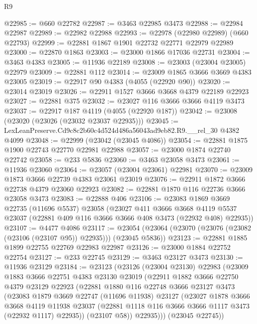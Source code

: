\begin{lexlean}{R9}
\begin{coremodule}
@22985 := @660 @22782
@22987 := @3463 @22985 @3473
@22988 := @22984 @22987
@22989 := @22982 @22988
@22993 := @22978 (@22980 @22989) (@660 @22793)
@22999 := @22881 @1867 @1901 @22732 @22771 @22979 @22989
@23000 := @22870 @1863
@23003 := @23000 @1866 @17036 @22731
@23004 := @3463 @4383
@23005 := @11936 @22189
@23008 := @23003 (@23004 @23005) @22979
@23009 := @22881 @112
@23014 := @23009 @1865 @3666 @3669 @4383 @23005
@23019 := @22917 @90 @4383 (@4055 (@22920 @90))
@23020 := @23014 @23019
@23026 := @22911 @1527 @3666 @3668 @4379 @22189 @22923
@23027 := @22881 @375
@23032 := @23027 @116 @3666 @3666 @4119 @3473
@23037 := @22917 @187 @4119 (@4055 (@22920 @187))
@23042 := @23008 (@23020 (@23026 (@23032 @23037 @22935)))
@23045 := LexLeanPreserve.Cd9c8c2b60c4d524d486a56043ad9eb82.R9.__rel_30 @4382 @4099
@23048 := @22999 (@23042 (@23045 @4086))
@23054 := @22881 @1875 @1900 @22743 @22770 @22981 @22988
@23057 := @23000 @1874 @22740 @22742
@23058 := @233 @5836
@23060 := @3463 @23058 @3473
@23061 := @11936 @23060
@23064 := @23057 (@23004 @23061) @22981
@23070 := @23009 @1873 @3666 @22739 @4383 @23061 @23019
@23076 := @22911 @1872 @3666 @22738 @4379 @23060 @22923
@23082 := @22881 @1870 @116 @22736 @3666 @23058 @3473
@23083 := @22888 @406
@23106 := @23083
    @1869
    @3669
    @22735
    (@11696 @5537)
    @23058
    (@23027
      @411
      @3666
      @3668
      @4119
      @5537
      @23037
      (@22881 @409 @116 @3666 @3666 @408 @3473 (@22932 @408) @22935))
@23107 := @4477 @4086
@23117 := @23054 (@23064 (@23070 (@23076 (@23082 (@23106 (@23107 @95)) @22935))) (@23045 @5836))
@23123 := @22881 @1885 @1899 @22755 @22769 @22983 @22987
@23126 := @23000 @1884 @22752 @22754
@23127 := @233 @22745
@23129 := @3463 @23127 @3473
@23130 := @11936 @23129
@23184 := @23123
    (@23126
      (@23004 @23130)
      @22983
      (@23009
        @1883
        @3666
        @22751
        @4383
        @23130
        @23019
        (@22911
          @1882
          @3666
          @22750
          @4379
          @23129
          @22923
          (@22881
            @1880
            @116
            @22748
            @3666
            @23127
            @3473
            (@23083
              @1879
              @3669
              @22747
              (@11696 @11938)
              @23127
              (@23027
                @1878
                @3666
                @3668
                @4119
                @11938
                @23037
                (@22881 @1118 @116 @3666 @3666 @1117 @3473 (@22932 @1117) @22935))
              (@23107 @58))
            @22935)))
      (@23045 @22745))

\end{coremodule}
\end{lexlean}
